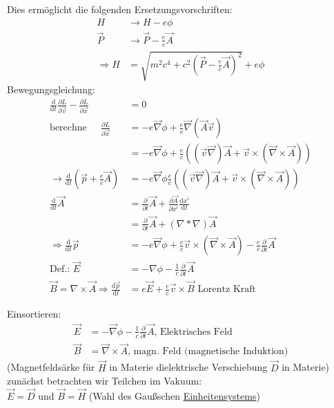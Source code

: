 \documentclass[a4paper]{article}
\begin{document}
Dies ermöglicht die folgenden Ersetzungsvorschriften:
\begin{align}
H &\rightarrow H-e\phi\\
\vec{P} &\rightarrow \vec{P}-\frac{e}{c}\vec{A}\\
\Rightarrow H&=\sqrt{m^2c^4+c^2\left(\vec{P}-\frac{e}{c}\vec{A}\right)^2}+e\phi
\end{align}
Bewegungsgleichung:
\begin{align}
\frac{\mathrm{d}}{\mathrm{d}t}\frac{\partial L}{\partial \vec{v}}-\frac{\partial L}{\partial
\vec{x}}&=0\\
\text{berechne }\ \ \ \ \  \frac{\partial
L}{\partial\vec{x}}&=-e\vec{\nabla}\phi+ \frac{e}{c}\vec{\nabla}(\vec{A}\vec{v})\\
&=-e\vec{\nabla}\phi+\frac{e}{c}\left(
(\vec{v}\vec{\nabla})\vec{A}+\vec{v}\times(\vec{\nabla}\times\vec{A}) \right)\\
\rightarrow \frac{\mathrm{d}}{\mathrm{d}t}(\vec{p}+\frac{e}{c}\vec{A})&=-e\vec{\nabla}\phi
\frac{e}{c}\left( (\vec{v}\vec{\nabla})\vec{A}+\vec{v}\times(\vec{\nabla}\times\vec{A})
\right)\\
\frac{\mathrm{d}}{\mathrm{d}t}\vec{A}&=\frac{\partial}{\partial t}\vec{A}+
\frac{\partial\vec{A}}{\partial x^i}\frac{\mathrm{d}x^i}{\mathrm{d}t}\\
&=\frac{\partial}{\partial t}\vec{A}+(\nabla*\nabla)\vec{A}\\
\Rightarrow
\frac{\mathrm{d}}{\mathrm{d}t}\vec{p}&=-e\vec{\nabla}\phi+\frac{e}{c}\vec{v}
\times(\vec{\nabla}\times\vec{A}) -\frac{e}{c}\frac{\partial}{\partial t}\vec{A}\\
\text{Def.: }\vec{E}&=-\nabla\phi-\frac{1}{c}\frac{\partial}{\partial
t}\vec{A}\\
\vec{B}=\nabla \times \vec{A}
\Rightarrow \frac{\mathrm{d}\vec{p}}{\mathrm{d}t}&=e\vec{E}+\frac{e}{c}\vec{v}\times\vec{B} 
\text{ Lorentz Kraft}
\end{align}

Einsortieren:
\begin{align}
\vec{E}&=-\vec{\nabla}\phi-\frac{1}{c}\frac{\partial}{\partial t}\vec{A}
\text{, Elektrisches Feld}\\
\vec{B}&=\vec{\nabla}\times\vec{A} \text{, magn. Feld (magnetische Induktion)}
\end{align}
(Magnetfeldsärke für $\vec{H}$ in Materie dielektrische Verschiebung $\vec{D}$
in Materie)\\
zunächst betrachten wir Teilchen im Vakuum:\\
$\vec{E}=\vec{D}$ und $\vec{B}=\vec{H}$ (Wahl des Gaußschen
\underline{Einheitensystems})
\end{document}
